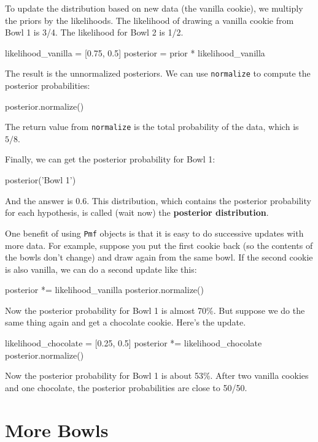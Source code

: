 \documentclass[12pt]{book}
\theoremstyle{exercise}
\newcommand{\py}[1]{{\tt #1}}%
\begin{document}
To update the distribution based on new data (the vanilla cookie),
we multiply the priors by the likelihoods.  The likelihood
of drawing a vanilla cookie from Bowl 1 is 3/4.  The likelihood
for Bowl 2 is 1/2.

\begin{code}
likelihood_vanilla = [0.75, 0.5]
posterior = prior * likelihood_vanilla
\end{code}

The result is the unnormalized posteriors.
We can use \py{normalize} to compute the posterior probabilities:

\begin{code}
posterior.normalize()
\end{code}

The return value from \py{normalize} is the total probability of the data, which is $5/8$.

Finally, we can get the posterior probability for Bowl 1:

\begin{code}
posterior('Bowl 1')
\end{code}

And the answer is 0.6.
This distribution, which contains the posterior probability for each hypothesis, is called (wait now) the {\bf posterior distribution}.

One benefit of using \py{Pmf} objects is that it is easy to do successive updates with more data.
For example, suppose you put the first cookie back (so the contents of the bowls don't change) and draw again from the same bowl.
If the second cookie is also vanilla, we can do a second update like this:

\begin{code}
posterior *= likelihood_vanilla
posterior.normalize()
\end{code}

Now the posterior probability for Bowl 1 is almost 70\%.
But suppose we do the same thing again and get a chocolate cookie.
Here's the update.

\begin{code}
likelihood_chocolate = [0.25, 0.5]
posterior *= likelihood_chocolate
posterior.normalize()
\end{code}

Now the posterior probability for Bowl 1 is about 53\%.
After two vanilla cookies and one chocolate, the posterior probabilities are close to 50/50.


\section{More Bowls}
\label{morebowls}
\end{document}
